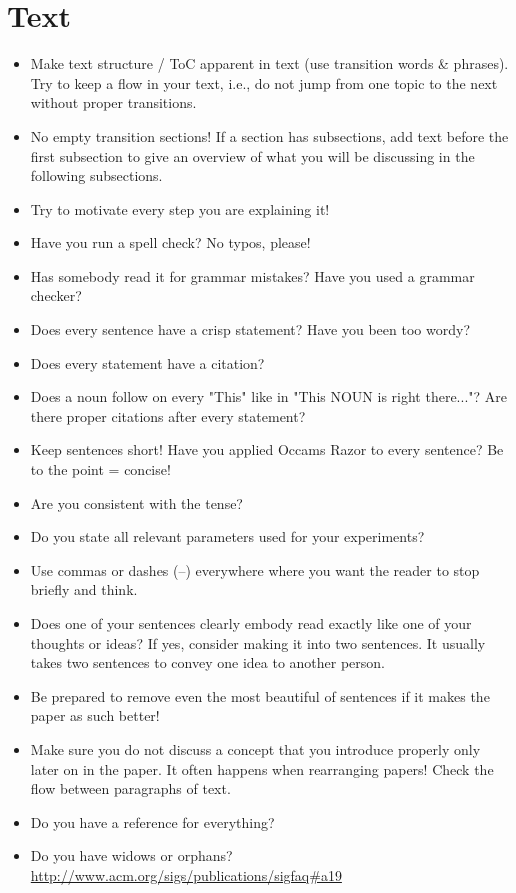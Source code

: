 \section{Text}
\begin{itemize}

\item Make text structure / ToC apparent in text (use transition words \& phrases). Try to keep a flow in your text, i.e., do not jump from one topic to the next without proper transitions.
\item No empty transition sections! If a section has subsections, add text before the first subsection to give an overview of what you will be discussing in the following subsections.
\item Try to motivate every step you are explaining it!
\item Have you run a spell check? No typos, please!
\item Has somebody read it for grammar mistakes? Have you used a grammar checker?
\item Does every sentence have a crisp statement? Have you been too wordy?
\item Does every statement have a citation?
\item Does a noun follow on every "This" like in "This NOUN is right there..."? Are there proper citations after every statement?
\item Keep sentences short! Have you applied Occams Razor to every sentence? Be to the point = concise!
\item Are you consistent with the tense?
\item Do you state all relevant parameters used for your experiments?
\item Use commas or dashes (--) everywhere where you want the reader to stop briefly and think.
\item Does one of your sentences clearly embody read exactly like one of your thoughts or ideas? If yes, consider making it into two sentences. It usually takes two sentences to convey one idea to another person.
\item Be prepared to remove even the most beautiful of sentences if it makes the paper as such better!
\item Make sure you do not discuss a concept that you introduce properly only later on in the paper. It often happens when rearranging papers! Check the flow between paragraphs of text.
\item Do you have a reference for everything?
\item Do you have widows or orphans? \url{http://www.acm.org/sigs/publications/sigfaq#a19}

\end{itemize}

